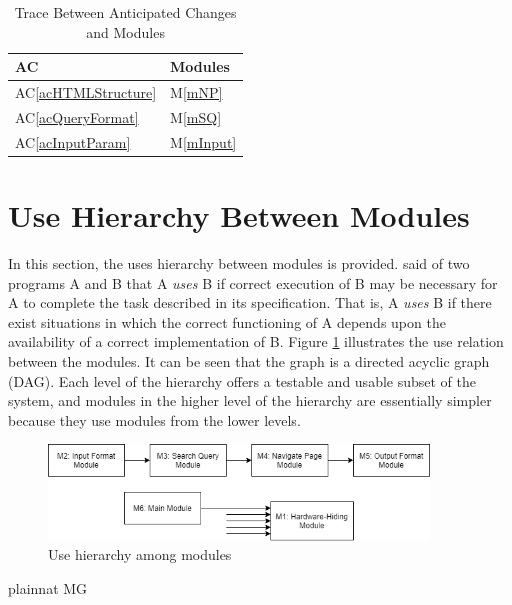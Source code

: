 \documentclass[12pt, titlepage]{article}
\newcommand{\acref}[1]{AC\ref{#1}}
\newcommand{\mref}[1]{M\ref{#1}}
\begin{document}
\begin{table}[H]
\centering
\begin{tabular}{p{} p{}}
\toprule
\textbf{AC} & \textbf{Modules}\\
\midrule
\acref{acHTMLStructure} & \mref{mNP}\\
\acref{acQueryFormat} & \mref{mSQ}\\
\acref{acInputParam} & \mref{mInput}\\
\bottomrule
\end{tabular}
\caption{Trace Between Anticipated Changes and Modules}
\label{table:tracechanges}
\label{TblACT}
\end{table}

\newpage

\section{Use Hierarchy Between Modules} \label{SecUse}

In this section, the uses hierarchy between modules is
provided. \citet{Parnas1978} said of two programs A and B that A {\em uses} B if
correct execution of B may be necessary for A to complete the task described in
its specification. That is, A {\em uses} B if there exist situations in which
the correct functioning of A depends upon the availability of a correct
implementation of B.  Figure \ref{FigUH} illustrates the use relation between
the modules. It can be seen that the graph is a directed acyclic graph
(DAG). Each level of the hierarchy offers a testable and usable subset of the
system, and modules in the higher level of the hierarchy are essentially simpler
because they use modules from the lower levels.

\begin{figure}[H]
\centering
\includegraphics[width=0.9\textwidth]{UsesHierarchy.png}
\caption{Use hierarchy among modules}
\label{FigUH}
\end{figure}


 {plainnat}
 {MG}
\end{document}
